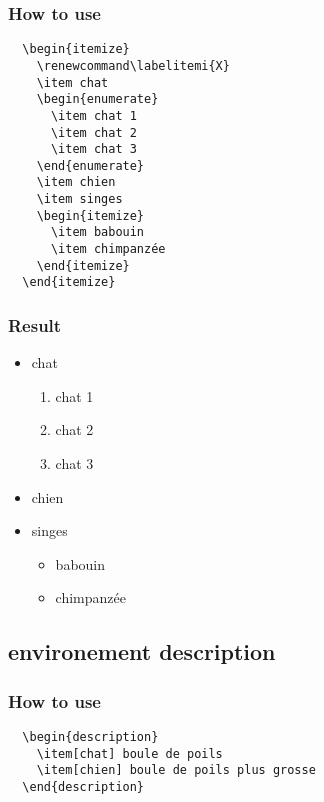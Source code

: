 \documentclass[a4paper,12pt]{article}
\begin{document}
\subsubsection{How to use}
\begin{verbatim}
  \begin{itemize}
    \renewcommand\labelitemi{X}
    \item chat
    \begin{enumerate}
      \item chat 1
      \item chat 2
      \item chat 3
    \end{enumerate}
    \item chien
    \item singes
    \begin{itemize}
      \item babouin
      \item chimpanzée
    \end{itemize}
  \end{itemize}
\end{verbatim}
\subsubsection{Result}
\begin{itemize}
  \renewcommand\labelitemi{X}
  \item chat
  \begin{enumerate}
    \item chat 1
    \item chat 2
    \item chat 3
  \end{enumerate}
  \item chien
  \item singes
  \begin{itemize}
    \item babouin
    \item chimpanzée
  \end{itemize}
\end{itemize}

\subsection{environement description}
\subsubsection{How to use}
\begin{verbatim}
  \begin{description}
    \item[chat] boule de poils
    \item[chien] boule de poils plus grosse
  \end{description}
\end{verbatim}
\end{document}
